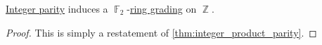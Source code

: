\begin{corollary}\label{thm:integer_parity_grading}
  \hyperref[def:integer_parity]{Integer parity} induces a \( \BbbF_2 \)-\hyperref[def:graded_ring]{ring grading} on \( \BbbZ \).
\end{corollary}
\begin{proof}
  This is simply a restatement of \cref{thm:integer_product_parity}.
\end{proof}
